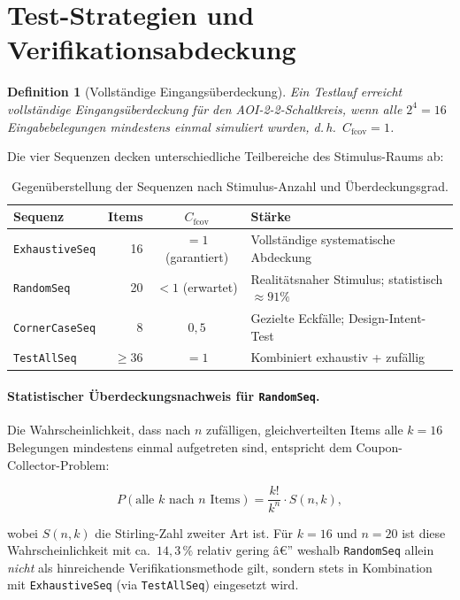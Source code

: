 ﻿\documentclass[12pt,a4paper]{report}
\newtheorem{definition}{Definition}[section]
\begin{document}
\section{Test-Strategien und Verifikationsabdeckung}
\label{subsec:test_strategien}

\begin{definition}[Vollständige Eingangsüberdeckung]
Ein Testlauf erreicht \emph{vollständige Eingangsüberdeckung} für den
AOI-2-2-Schaltkreis, wenn alle $2^4 = 16$ Eingabebelegungen mindestens
einmal simuliert wurden, d.\,h.\
$C_{\mathrm{fcov}} = 1$.
\end{definition}

Die vier Sequenzen decken unterschiedliche Teilbereiche des Stimulus-Raums ab:

\begin{table}[H]
\centering
\begin{tabular}{|l|r|c|p{4.5cm}|}
\hline
\textbf{Sequenz} & \textbf{Items} & $C_{\mathrm{fcov}}$ & \textbf{Stärke} \\
\hline
\texttt{ExhaustiveSeq} & 16 & $=1$ (garantiert) & Vollständige systematische Abdeckung \\
\texttt{RandomSeq} & 20 & $<1$ (erwartet) & Realitätsnaher Stimulus; statistisch $\approx\!91\%$ \\
\texttt{CornerCaseSeq} & 8 & $0{,}5$ & Gezielte Eckfälle; Design-Intent-Test \\
\texttt{TestAllSeq} & $\geq\!36$ & $=1$ & Kombiniert exhaustiv + zufällig \\
\hline
\end{tabular}
\caption{Gegenüberstellung der Sequenzen nach Stimulus-Anzahl und Überdeckungsgrad.}
\label{tab:sequenz_vergleich}
\end{table}

\paragraph{Statistischer Überdeckungsnachweis für \texttt{RandomSeq}.}
\label{par:random_coverage}
Die Wahrscheinlichkeit, dass nach $n$ zufälligen, gleichverteilten Items
alle $k = 16$ Belegungen mindestens einmal aufgetreten sind, entspricht
dem Coupon-Collector-Problem:

\begin{equation}
    P(\text{alle } k \text{ nach } n \text{ Items}) = \frac{k!}{k^n} \cdot S(n, k),
\end{equation}

wobei $S(n,k)$ die Stirling-Zahl zweiter Art ist. Für $k = 16$ und $n = 20$ ist
diese Wahrscheinlichkeit mit ca.\ $14{,}3\,\%$ relativ gering â€” weshalb
\texttt{RandomSeq} allein \emph{nicht} als hinreichende Verifikationsmethode
gilt, sondern stets in Kombination mit \texttt{ExhaustiveSeq} (via
\texttt{TestAllSeq}) eingesetzt wird.
\end{document}
